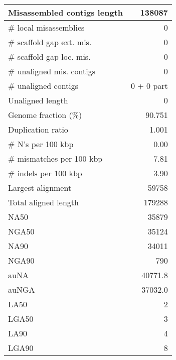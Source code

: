 \documentclass[12pt,a4paper]{article}
\begin{document}
\begin{table}[ht]
\begin{center}
\begin{tabular}{|l*{1}{|r}|}
Misassembled contigs length & 138087 \\ \hline
\# local misassemblies & 0 \\ \hline
\# scaffold gap ext. mis. & 0 \\ \hline
\# scaffold gap loc. mis. & 0 \\ \hline
\# unaligned mis. contigs & 0 \\ \hline
\# unaligned contigs & 0 + 0 part \\ \hline
Unaligned length & 0 \\ \hline
Genome fraction (\%) & 90.751 \\ \hline
Duplication ratio & 1.001 \\ \hline
\# N's per 100 kbp & 0.00 \\ \hline
\# mismatches per 100 kbp & 7.81 \\ \hline
\# indels per 100 kbp & 3.90 \\ \hline
Largest alignment & 59758 \\ \hline
Total aligned length & 179288 \\ \hline
NA50 & 35879 \\ \hline
NGA50 & 35124 \\ \hline
NA90 & 34011 \\ \hline
NGA90 & 790 \\ \hline
auNA & 40771.8 \\ \hline
auNGA & 37032.0 \\ \hline
LA50 & 2 \\ \hline
LGA50 & 3 \\ \hline
LA90 & 4 \\ \hline
LGA90 & 8 \\ \hline
\end{tabular}
\end{center}
\end{table}
\end{document}
